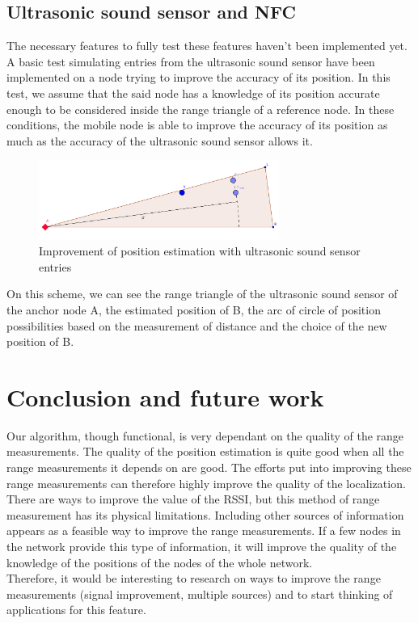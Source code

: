 \documentclass[a4paper,10pt]{article}
\begin{document}
\subsection{Ultrasonic sound sensor and NFC}
The necessary features to fully test these features haven't been implemented yet. A basic test simulating entries from the ultrasonic sound
sensor have been implemented on a node trying to improve the accuracy of its position. In this test, we assume that the said node has a knowledge
of its position accurate enough to be considered inside the range triangle of a reference node. In these conditions, the mobile node is able to
improve the accuracy of its position as much as the accuracy of the ultrasonic sound sensor allows it.
\begin{figure}[H]
\begin{center}
 \includegraphics[width=0.7\textwidth]{triangle_us.png}
\end{center}
\caption{Improvement of position estimation with ultrasonic sound sensor entries}
\end{figure}
\noindent
On this scheme, we can see the range triangle of the ultrasonic sound sensor of the anchor node A, the estimated position of B, the arc of circle
of position possibilities based on the measurement of distance and the choice of the new position of B.

\section{Conclusion and future work}
Our algorithm, though functional, is very dependant on the quality of the range measurements. The quality of the position estimation is quite good
when all the range measurements it depends on are good. The efforts put into improving these range measurements can therefore highly improve the
quality of the localization. There are ways to improve the value of the RSSI, but this method of range measurement has its physical limitations.
Including other sources of information appears as a feasible way to improve the range measurements. If a few nodes in the network provide this
type of information, it will improve the quality of the knowledge of the positions of the nodes of the whole network. \\
Therefore, it would be interesting to research on ways to improve the range measurements (signal improvement, multiple sources) and to start
thinking of applications for this feature.
\end{document}
